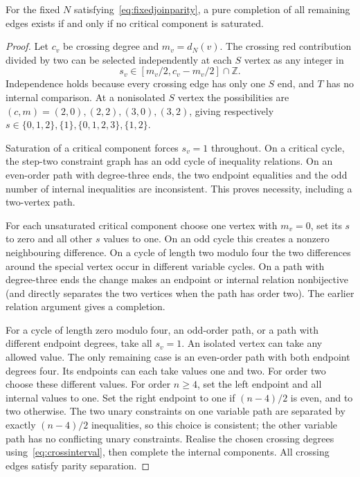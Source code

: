 \begin{theorem}\label{thm:exactindependent}
For the fixed $N$ satisfying~\eqref{eq:fixedjoinparity}, a pure completion
of all remaining edges exists if and only if no critical component is
saturated.
\end{theorem}
\begin{proof}
Let $c_v$ be crossing degree and $m_v=d_N(v)$. The crossing red
contribution divided by two can be selected independently at each $S$
vertex as any integer in
\begin{equation}\label{eq:crossinterval}
 s_v\in[m_v/2,c_v-m_v/2]\cap\mathbb Z.
\end{equation}
Independence holds because every crossing edge has only one $S$ end,
and $T$ has no internal comparison. At a nonisolated $S$ vertex the
possibilities are $(c,m)=(2,0),(2,2),(3,0),(3,2)$, giving respectively
$s\in\{0,1,2\},\{1\},\{0,1,2,3\},\{1,2\}$.

Saturation of a critical component forces $s_v=1$ throughout. On a
critical cycle, the step-two constraint graph has an odd cycle of
inequality relations. On an even-order path with degree-three ends,
the two endpoint equalities and the odd number of internal inequalities
are inconsistent. This proves necessity, including a two-vertex path.

For each unsaturated critical component choose one vertex with $m_v=0$,
set its $s$ to zero and all other $s$ values to one. On an odd cycle this
creates a nonzero neighbouring difference. On a cycle of length two
modulo four the two differences around the special vertex occur in
different variable cycles. On a path with degree-three ends the change
makes an endpoint or internal relation nonbijective (and directly
separates the two vertices when the path has order two). The earlier
relation argument gives a completion.

For a cycle of length zero modulo four, an odd-order path, or a path
with different endpoint degrees, take all $s_v=1$. An isolated vertex
can take any allowed value. The only remaining case is an even-order
path with both endpoint degrees four. Its endpoints can each take
values one and two. For order two choose these different values. For
order $n\ge4$, set the left endpoint and all internal values to one.
Set the right endpoint to one if $(n-4)/2$ is even, and to two otherwise.
The two unary constraints on one variable path are separated by exactly
$(n-4)/2$ inequalities, so this choice is consistent; the other variable
path has no conflicting unary constraints. Realise the chosen crossing
degrees using~\eqref{eq:crossinterval}, then complete the internal
components. All crossing edges satisfy parity separation.
\end{proof}

